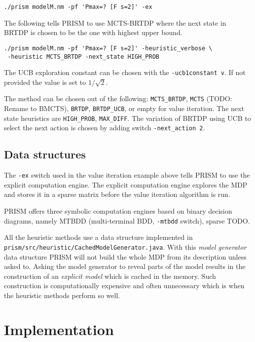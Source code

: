 \medskip
\begin{verbatim}
./prism modelM.nm -pf 'Pmax=? [F s=2]' -ex
\end{verbatim}
\medskip

The following tells PRISM to use MCTS-BRTDP where the next state in
BRTDP is chosen to be the one with highest upper bound.

\medskip
\begin{verbatim}
./prism modelM.nm -pf 'Pmax=? [F s=2]' -heuristic_verbose \
 -heuristic MCTS_BRTDP -next_state HIGH_PROB
\end{verbatim}
\medskip

The UCB exploration constant can be chosen with the
\verb|-ucb1constant v|. If not provided the value is set to
$1/\sqrt{2}$.

The method can be chosen out of the following: \verb|MCTS_BRTDP|,
\verb|MCTS| (TODO: Rename to BMCTS), \verb|BRTDP|, \verb|BRTDP_UCB|,
or empty for value  iteration.
The next state heuristics are
\verb|HIGH_PROB|, \verb|MAX_DIFF|.
The variation of BRTDP using UCB to select the next action is chosen by
adding switch \verb|-next_action 2|.

\subsection*{Data structures}
The \verb|-ex| switch used in the value iteration example above tells
PRISM to use the explicit computation engine.
The explicit computation engine explores the MDP and stores it in
a sparse matrix before the value iteration algorithm is run.

PRISM offers three symbolic computation engines based on binary decision
diagrams, namely MTBDD (multi-terminal BDD, \verb|-mtbdd| switch),
sparse TODO.

All the heuristic methods use a data structure implemented in
\verb|prism/src/heuristic/CachedModelGenerator.java|.
With this {\em model generator} data structure PRISM will not build the
whole MDP from its description unless asked to.
Asking the model generator to reveal parts of the model results in the
construction of an {\em explicit model} which is cached in the memory.
Such construction is computationally expensive and often unnecessary
which is when the heuristic methods perform so well.

\section{Implementation}

